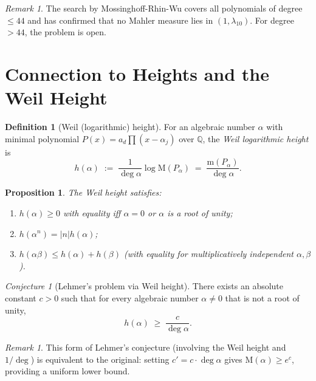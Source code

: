 \documentclass[12pt,a4paper]{amsart}
\newtheorem{proposition}[theorem]{Proposition}
\theoremstyle{definition}
\newtheorem{definition}[theorem]{Definition}
\theoremstyle{remark}
\newtheorem{remark}[theorem]{Remark}
\newtheorem{conjecture}[theorem]{Conjecture}
\newcommand{\Q}{\mathbb{Q}}
\newcommand{\M}{\mathrm{M}}
\newcommand{\m}{\mathrm{m}}
\begin{document}
\begin{remark}
  The search by Mossinghoff-Rhin-Wu \cite{MRW2008} covers all polynomials of degree
  $\leq 44$ and has confirmed that no Mahler measure lies in $(1, \lambda_{10})$.
  For degree $> 44$, the problem is open.
\end{remark}

\section{Connection to Heights and the Weil Height}\label{sec:heights}

\begin{definition}[Weil (logarithmic) height]
  For an algebraic number $\alpha$ with minimal polynomial $P(x) = a_d\prod(x-\alpha_j)$
  over $\Q$, the \emph{Weil logarithmic height} is
  \[
    h(\alpha) \;:=\; \frac{1}{\deg\alpha} \log \M(P_\alpha)
              \;=\; \frac{\m(P_\alpha)}{\deg\alpha}.
  \]
\end{definition}

\begin{proposition}
  The Weil height satisfies:
  \begin{enumerate}[label=(\roman*)]
    \item $h(\alpha) \geq 0$ with equality iff $\alpha = 0$ or $\alpha$ is a root of unity;
    \item $h(\alpha^n) = |n| h(\alpha)$;
    \item $h(\alpha\beta) \leq h(\alpha) + h(\beta)$ (with equality for multiplicatively
      independent $\alpha, \beta$).
  \end{enumerate}
\end{proposition}

\begin{conjecture}[Lehmer's problem via Weil height]\label{conj:lehmer_height}
  There exists an absolute constant $c > 0$ such that for every algebraic number
  $\alpha \neq 0$ that is not a root of unity,
  \[
    h(\alpha) \;\geq\; \frac{c}{\deg\alpha}.
  \]
\end{conjecture}

\begin{remark}
  This form of Lehmer's conjecture (involving the Weil height and $1/\deg$) is equivalent
  to the original: setting $c' = c \cdot \deg\alpha$ gives $\M(\alpha) \geq e^c$,
  providing a uniform lower bound.
\end{remark}
\end{document}

